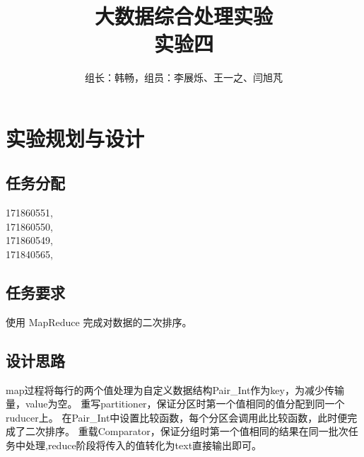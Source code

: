 \documentclass[a4paper,UTF8]{article}
\author{组长：韩畅，组员：李展烁、王一之、闫旭芃}
\numberwithin{equation}{section}
\begin{document}
{}
\title{大数据综合处理实验\\
实验四}
\maketitle

\section{实验规划与设计}
\subsection{任务分配}
{171860551, }\\ \indent
{171860550, }\\ \indent
{171860549, }\\ \indent
{171840565, }
\subsection{任务要求}
使用 MapReduce 完成对数据的二次排序。
\subsection{设计思路}
map过程将每行的两个值处理为自定义数据结构Pair\_Int作为key，为减少传输量，value为空。
重写partitioner，保证分区时第一个值相同的值分配到同一个ruducer上。
在Pair\_Int中设置比较函数，每个分区会调用此比较函数，此时便完成了二次排序。
重载Comparator，保证分组时第一个值相同的结果在同一批次任务中处理,reduce阶段将传入的值转化为text直接输出即可。
\end{document}
